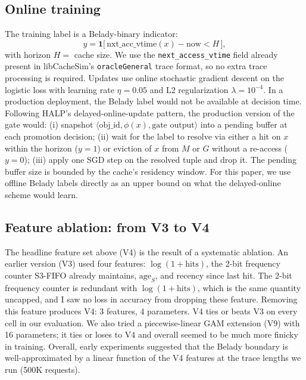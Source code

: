 \documentclass[letterpaper,twocolumn,10pt]{article}
\begin{document}
\subsection{Online training}
 
The training label is a Belady-binary indicator:
\[
y = \mathbf{1}\big[\,\textrm{nxt\_acc\_vtime}(x) - \textrm{now} < H\,\big],
\]
with horizon $H = $ cache size. We use the
\texttt{next\_access\_vtime} field already present in
libCacheSim's \texttt{oracleGeneral} trace format, so no extra
trace processing is required. Updates use online stochastic
gradient descent on the logistic loss with learning rate
$\eta = 0.05$ and L2 regularization $\lambda = 10^{-4}$.
In a production deployment, the Belady label would not be
available at decision time. Following HALP's
delayed-online-update pattern, the production version of the gate
would: (i) snapshot $\langle\textrm{obj\_id}, \phi(x), \textrm{gate output}\rangle$
into a pending buffer at each promotion decision; (ii) wait for
the label to resolve via either a hit on $x$ within the horizon
($y=1$) or eviction of $x$ from $M$ or $G$ without a re-access
($y=0$); (iii) apply one SGD step on the resolved tuple and drop
it. The pending buffer size is bounded by the cache's residency
window. For this paper, we use offline Belady labels directly
as an upper bound on what the delayed-online scheme would learn.

 
\subsection{Feature ablation: from V3 to V4}
 
The headline feature set above (V4) is the result of a systematic
ablation. An earlier version (V3) used four features: $\log(1+\textrm{hits})$,
the 2-bit frequency counter S3-FIFO already maintains, 
$\textrm{age}_S$, and recency since
last hit. The 2-bit frequency counter is redundant with
  $\log(1+\textrm{hits})$, which is the same quantity uncapped, and I saw no loss in accuracy from dropping these feature.
Removing this feature produces V4: 3 features, 4 parameters.
V4 ties or beats V3 on every cell in our evaluation. We also tried
a piecewise-linear GAM extension (V9) with 16 parameters; it ties
or loses to V4 and overall seemed to be much more finicky in training. Overall, early experiments suggested that the Belady boundary is well-approximated
by a linear function of the V4 features at the
trace lengths we run (500K requests).
 
\end{document}

